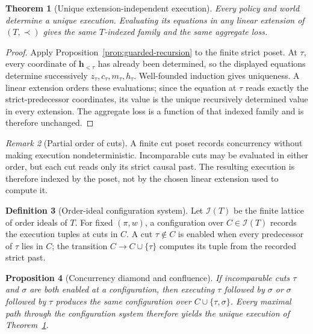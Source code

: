 \documentclass[11pt]{article}
\theoremstyle{plain}
\newtheorem{theorem}{Theorem}[section]
\newtheorem{proposition}[theorem]{Proposition}
\theoremstyle{definition}
\newtheorem{definition}[theorem]{Definition}
\theoremstyle{remark}
\newtheorem{remark}[theorem]{Remark}
\begin{document}
\begin{theorem}[Unique extension-independent execution]
\label{thm:operational-execution}
Every policy and world determine a unique execution. Evaluating its equations in
any linear extension of $(T,\prec)$ gives the same $T$-indexed family and the
same aggregate loss.
\end{theorem}

\begin{proof}
Apply Proposition~\ref{prop:guarded-recursion} to the finite strict poset. At
$\tau$, every
coordinate of $\mathbf h_{<\tau}$ has already been determined, so the displayed
equations determine successively $z_\tau,c_\tau,m_\tau,h_\tau$. Well-founded
induction gives uniqueness. A linear extension orders these evaluations;
since the equation at $\tau$ reads exactly the strict-predecessor coordinates,
its value is the unique recursively determined value in every extension. The
aggregate loss is a function of that indexed family and is therefore unchanged.
\end{proof}

\begin{remark}[Partial order of cuts]
A finite cut poset records concurrency without making execution nondeterministic.
Incomparable cuts may be evaluated in either order, but each cut reads only its
strict causal past. The resulting execution is therefore indexed by the poset,
not by the chosen linear extension used to compute it.
\end{remark}

\begin{definition}[Order-ideal configuration system]
\label{def:order-ideal-configuration}
Let $\mathcal I(T)$ be the finite lattice of order ideals of $T$. For fixed
$(\pi,w)$, a configuration over $C\in\mathcal I(T)$ records the execution
tuples at cuts in $C$. A cut $\tau\notin C$ is enabled when every predecessor
of $\tau$ lies in $C$; the transition $C\to C\cup\{\tau\}$ computes its tuple
from the recorded strict past.
\end{definition}

\begin{proposition}[Concurrency diamond and confluence]
\label{prop:operational-confluence}
If incomparable cuts $\tau$ and $\sigma$ are both enabled at a configuration,
then executing $\tau$ followed by $\sigma$ or $\sigma$ followed by $\tau$
produces the same configuration over $C\cup\{\tau,\sigma\}$. Every maximal path
through the configuration system therefore yields the unique execution of
Theorem~\ref{thm:operational-execution}.
\end{proposition}
\end{document}
